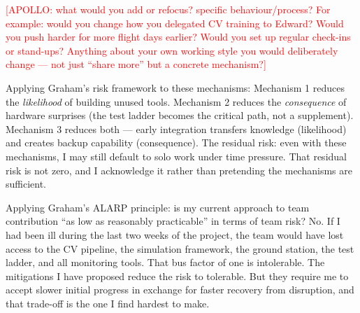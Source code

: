 \textcolor{red}{[APOLLO: what would you add or refocus? specific behaviour/process? For example: would you change how you delegated CV training to Edward? Would you push harder for more flight days earlier? Would you set up regular check-ins or stand-ups? Anything about your own working style you would deliberately change --- not just ``share more'' but a concrete mechanism?]}

Applying Graham's risk framework to these mechanisms: Mechanism 1 reduces the \textit{likelihood} of building unused tools. Mechanism 2 reduces the \textit{consequence} of hardware surprises (the test ladder becomes the critical path, not a supplement). Mechanism 3 reduces both --- early integration transfers knowledge (likelihood) and creates backup capability (consequence). The residual risk: even with these mechanisms, I may still default to solo work under time pressure. That residual risk is not zero, and I acknowledge it rather than pretending the mechanisms are sufficient.

Applying Graham's ALARP principle: is my current approach to team contribution ``as low as reasonably practicable'' in terms of team risk? No. If I had been ill during the last two weeks of the project, the team would have lost access to the CV pipeline, the simulation framework, the ground station, the test ladder, and all monitoring tools. That bus factor of one is intolerable. The mitigations I have proposed reduce the risk to tolerable. But they require me to accept slower initial progress in exchange for faster recovery from disruption, and that trade-off is the one I find hardest to make.
